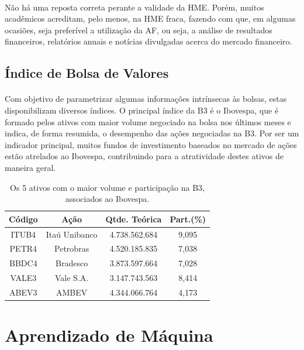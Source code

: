 \documentclass[grad,numbers]{coppe}
\begin{document}
 			\paragraph{}Não há uma reposta correta perante a validade da HME. Porém, muitos acadêmicos acreditam, pelo menos, na HME fraca\cite{emh-br}, fazendo com que, em algumas ocasiões, seja preferível a utilização da AF, ou seja, a análise de resultados financeiros, relatórios anuais e notícias divulgadas acerca do mercado financeiro.
 			
		\subsection{Índice de Bolsa de Valores}
			\paragraph{}Com objetivo de parametrizar algumas informações intrínsecas às bolsas, estas disponibilizam diversos índices. O principal índice da B3 é o Ibovespa, que é formado pelos ativos com maior volume negociado na bolsa nos últimos meses e indica, de forma resumida, o desempenho das ações negociadas na B3. Por ser um indicador principal, muitos fundos de investimento baseados no mercado de ações estão atrelados ao Ibovespa, contribuindo para a atratividade destes ativos de maneira geral.
			\begin{table}[h]
				\caption{Os 5 ativos com o maior volume e participação na B3, associados ao Ibovespa\cite{carteira-bovespa}.}
				\label{tab:courses}
				\centering
				{\footnotesize
					\begin{tabular}{|c|c|c|c|}
						\hline
						Código & Ação & Qtde. Teórica & Part.(\%)\\
						\hline
						ITUB4 &  Itaú Unibanco & 4.738.562.684 & 9,095 \\
						PETR4 &  Petrobras & 4.520.185.835 & 7,038 \\
						BBDC4 &  Bradesco & 3.873.597.664 & 7,028 \\
						VALE3 &  Vale S.A. & 3.147.743.563 & 8,414 \\
						ABEV3 &  AMBEV & 4.344.066.764 & 4,173 \\
						\hline
				\end{tabular}}
			\end{table}
			 
  \section{Aprendizado de Máquina}
\end{document}
